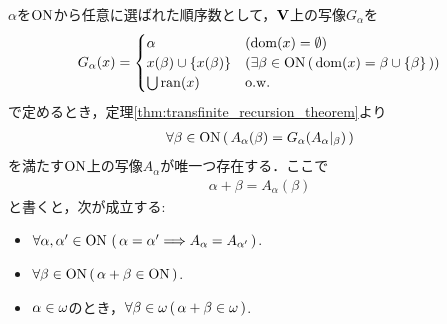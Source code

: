 	\begin{screen}
		\begin{thm}[順序数の加法]\label{thm:the_definition_of_addition_of_ordinal_numbers}
			$\alpha$を$\mathrm{ON}$から任意に選ばれた順序数として，$\mathbf{V}$上の写像$G_\alpha$を
			\begin{align}
				G_\alpha(x) = 
				\begin{cases}
					\alpha & (\operatorname{dom}(x) = \emptyset) \\
					x(\beta) \cup \{x(\beta)\} & (
					\exists \beta \in \mathrm{ON}\, (\, \operatorname{dom}(x) = \beta \cup \{\beta\}\, )) \\
					\bigcup \operatorname{ran}(x) & \mathrm{o.w.}
				\end{cases}
			\end{align}
			で定めるとき，定理\ref{thm:transfinite_recursion_theorem}より
			\begin{align}
				\forall \beta \in \mathrm{ON}\, (\, A_\alpha(\beta) = G_\alpha(A_\alpha|_\beta)\, )
			\end{align}
			を満たす$\mathrm{ON}$上の写像$A_\alpha$が唯一つ存在する．ここで
			\begin{align}
				\alpha + \beta = A_\alpha (\beta)
			\end{align}
			と書くと，次が成立する:
			\begin{itemize}
				\item $\forall \alpha,\alpha' \in \mathrm{ON}\, \left(\, \alpha = \alpha' \Longrightarrow A_\alpha = A_{\alpha'}\, \right)$.
				\item $\forall \beta \in \mathrm{ON}\, (\, \alpha + \beta \in \mathrm{ON}\, )$.
				\item $\alpha \in {\bf \omega}$のとき，$\forall \beta \in {\bf \omega}\, (\, \alpha + \beta \in {\bf \omega}\, )$.
			\end{itemize}
		\end{thm}
	\end{screen}
	

